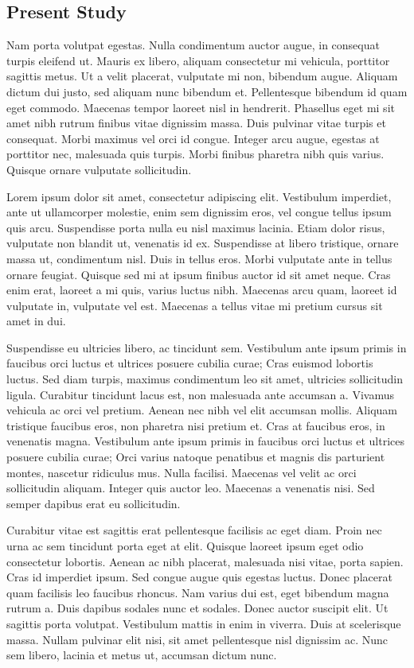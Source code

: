 \begin{refsection}
\subsection{Present Study}

Nam porta volutpat egestas. Nulla condimentum auctor augue, in consequat turpis eleifend ut. Mauris ex libero, aliquam consectetur mi vehicula, porttitor sagittis metus. Ut a velit placerat, vulputate mi non, bibendum augue. Aliquam dictum dui justo, sed aliquam nunc bibendum et. Pellentesque bibendum id quam eget commodo. Maecenas tempor laoreet nisl in hendrerit. Phasellus eget mi sit amet nibh rutrum finibus vitae dignissim massa. Duis pulvinar vitae turpis et consequat. Morbi maximus vel orci id congue. Integer arcu augue, egestas at porttitor nec, malesuada quis turpis. Morbi finibus pharetra nibh quis varius. Quisque ornare vulputate sollicitudin.

Lorem ipsum dolor sit amet, consectetur adipiscing elit. Vestibulum imperdiet, ante ut ullamcorper molestie, enim sem dignissim eros, vel congue tellus ipsum quis arcu. Suspendisse porta nulla eu nisl maximus lacinia. Etiam dolor risus, vulputate non blandit ut, venenatis id ex. Suspendisse at libero tristique, ornare massa ut, condimentum nisl. Duis in tellus eros. Morbi vulputate ante in tellus ornare feugiat. Quisque sed mi at ipsum finibus auctor id sit amet neque. Cras enim erat, laoreet a mi quis, varius luctus nibh. Maecenas arcu quam, laoreet id vulputate in, vulputate vel est. Maecenas a tellus vitae mi pretium cursus sit amet in dui.

Suspendisse eu ultricies libero, ac tincidunt sem. Vestibulum ante ipsum primis in faucibus orci luctus et ultrices posuere cubilia curae; Cras euismod lobortis luctus. Sed diam turpis, maximus condimentum leo sit amet, ultricies sollicitudin ligula. Curabitur tincidunt lacus est, non malesuada ante accumsan a. Vivamus vehicula ac orci vel pretium. Aenean nec nibh vel elit accumsan mollis. Aliquam tristique faucibus eros, non pharetra nisi pretium et. Cras at faucibus eros, in venenatis magna. Vestibulum ante ipsum primis in faucibus orci luctus et ultrices posuere cubilia curae; Orci varius natoque penatibus et magnis dis parturient montes, nascetur ridiculus mus. Nulla facilisi. Maecenas vel velit ac orci sollicitudin aliquam. Integer quis auctor leo. Maecenas a venenatis nisi. Sed semper dapibus erat eu sollicitudin.

Curabitur vitae est sagittis erat pellentesque facilisis ac eget diam. Proin nec urna ac sem tincidunt porta eget at elit. Quisque laoreet ipsum eget odio consectetur lobortis. Aenean ac nibh placerat, malesuada nisi vitae, porta sapien. Cras id imperdiet ipsum. Sed congue augue quis egestas luctus. Donec placerat quam facilisis leo faucibus rhoncus. Nam varius dui est, eget bibendum magna rutrum a. Duis dapibus sodales nunc et sodales. Donec auctor suscipit elit. Ut sagittis porta volutpat. Vestibulum mattis in enim in viverra. Duis at scelerisque massa. Nullam pulvinar elit nisi, sit amet pellentesque nisl dignissim ac. Nunc sem libero, lacinia et metus ut, accumsan dictum nunc.


\end{refsection}
